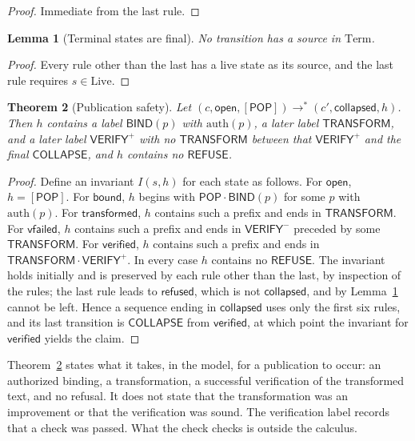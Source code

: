 \documentclass[11pt]{article}
\theoremstyle{plain}
\newtheorem{theorem}{Theorem}[section]
\newtheorem{lemma}[theorem]{Lemma}
\theoremstyle{definition}
\theoremstyle{remark}
\begin{document}
\begin{proof}
Immediate from the last rule. \qedhere
\end{proof}

\begin{lemma}[Terminal states are final]\label{lem:final}
No transition has a source in $\mathrm{Term}$.
\end{lemma}

\begin{proof}
Every rule other than the last has a live state as its source, and the last rule requires $s\in\mathrm{Live}$. \qedhere
\end{proof}

\begin{theorem}[Publication safety]\label{thm:pubsafe}
Let $(c,\mathsf{open},[\mathsf{POP}])\to^{*}(c',\mathsf{collapsed},h)$. Then $h$ contains a label $\mathsf{BIND}(p)$ with $\mathrm{auth}(p)$, a later label $\mathsf{TRANSFORM}$, and a later label $\mathsf{VERIFY}^{+}$ with no $\mathsf{TRANSFORM}$ between that $\mathsf{VERIFY}^{+}$ and the final $\mathsf{COLLAPSE}$, and $h$ contains no $\mathsf{REFUSE}$.
\end{theorem}

\begin{proof}
Define an invariant $I(s,h)$ for each state as follows. For $\mathsf{open}$, $h=[\mathsf{POP}]$. For $\mathsf{bound}$, $h$ begins with $\mathsf{POP}\cdot\mathsf{BIND}(p)$ for some $p$ with $\mathrm{auth}(p)$. For $\mathsf{transformed}$, $h$ contains such a prefix and ends in $\mathsf{TRANSFORM}$. For $\mathsf{vfailed}$, $h$ contains such a prefix and ends in $\mathsf{VERIFY}^{-}$ preceded by some $\mathsf{TRANSFORM}$. For $\mathsf{verified}$, $h$ contains such a prefix and ends in $\mathsf{TRANSFORM}\cdot\mathsf{VERIFY}^{+}$. In every case $h$ contains no $\mathsf{REFUSE}$. The invariant holds initially and is preserved by each rule other than the last, by inspection of the rules; the last rule leads to $\mathsf{refused}$, which is not $\mathsf{collapsed}$, and by Lemma~\ref{lem:final} cannot be left. Hence a sequence ending in $\mathsf{collapsed}$ uses only the first six rules, and its last transition is $\mathsf{COLLAPSE}$ from $\mathsf{verified}$, at which point the invariant for $\mathsf{verified}$ yields the claim. \qedhere
\end{proof}

Theorem~\ref{thm:pubsafe} states what it takes, in the model, for a publication to occur: an authorized binding, a transformation, a successful verification of the transformed text, and no refusal. It does not state that the transformation was an improvement or that the verification was sound. The verification label records that a check was passed. What the check checks is outside the calculus.
\end{document}
